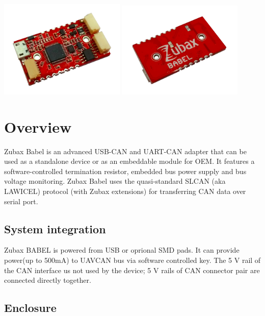\documentclass{zubaxdoc}
\begin{document}
\begin{titlepage}
\centering
\includegraphics[width=0.45\textwidth]{top}
\includegraphics[width=0.45\textwidth]{bottom}

\end{titlepage}

\tableofcontents
\BeginRightColumn
\listoffigures
\listoftables


\mainmatter

\chapter{Overview}

Zubax Babel is an advanced USB-CAN and UART-CAN adapter that can be used as a standalone device or as an embeddable module for OEM. It features a software-controlled termination resistor, embedded bus power supply and bus voltage monitoring. Zubax Babel uses the quasi-standard SLCAN (aka LAWICEL) protocol (with Zubax extensions) for transferring CAN data over serial port.

\section{System integration}

Zubax BABEL is powered from USB or oprional SMD pads. It can provide power(up to 500mA) to UAVCAN bus via software controlled key.  
The 5 V rail of the CAN interface us not used by the device; 5 V rails of CAN connector pair are connected directly together.

\section{Enclosure}\label{sec:enclosure}
\end{document}
